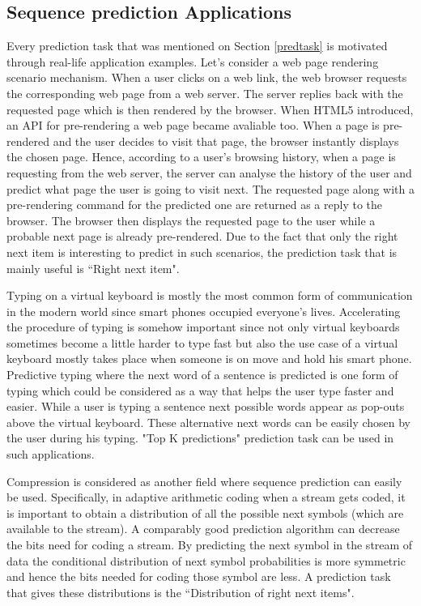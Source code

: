 \subsection{Sequence prediction Applications} \label{appl}
Every prediction task that was mentioned on Section \ref{predtask} is motivated through real-life application examples. Let's consider a web page rendering scenario mechanism. When a user clicks on a web link, the web browser requests the corresponding web page from a web server. The server replies back with the requested page which is then rendered by the browser. When HTML5 introduced, an API for pre-rendering a web page became avaliable too. When a page is pre-rendered and the user decides to visit that page, the browser instantly displays the chosen page. Hence, according to a user's browsing history, when a page is requesting from the web server, the server can analyse the history of the user and predict what page the user is going to visit next. The requested page along with a pre-rendering command for the predicted one are returned as a reply to the browser. The browser then displays the requested page to the user while a probable next page is already pre-rendered. Due to the fact that only the right next item is interesting to predict in such scenarios, the prediction task that is mainly useful is ``Right next item".
\par Typing on a virtual keyboard is mostly the most common form of communication in the modern world since smart phones occupied everyone's lives. Accelerating the procedure of typing is somehow important since not only virtual keyboards sometimes become a little harder to type fast but also the use case of a virtual keyboard mostly takes place when someone is on move and hold his smart phone. Predictive typing where the next word of a sentence is predicted is one form of typing which could be considered as a way that helps the user type faster and easier. While a user is typing a sentence next possible words appear as pop-outs above the virtual keyboard. These alternative next words can be easily chosen by the user during his typing. "Top K predictions" prediction task can be used in such applications.
\par Compression is considered as another field where sequence prediction can easily be used. Specifically, in adaptive arithmetic coding when a stream gets coded, it is important to obtain a distribution of all the possible next symbols (which are available to the stream). A comparably good prediction algorithm can decrease the bits need for coding a stream. By predicting the next symbol in the stream of data the conditional distribution of next symbol probabilities is more symmetric and hence the bits needed for coding those symbol are less. A prediction task that gives these distributions is the ``Distribution of right next items".
